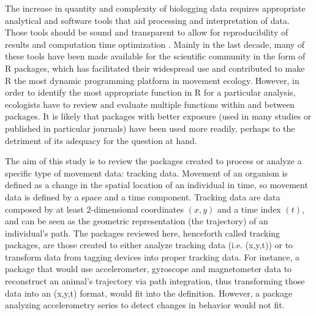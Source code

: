 \documentclass[a4paper,12pt]{article}
\begin{document}
	The increase in quantity and complexity of biologging data requires appropriate analytical and software tools that aid processing and interpretation of data. Those tools should be sound and transparent to allow for reproducibility of results and computation time optimization \citep{Urbano2010, reichman_challenges_2011, lowndes_our_2017}. %
	Mainly in the last decade, many of these tools have been made available for the scientific community in the form of R \citep{R2018} packages, which has facilitated their widespread use and contributed to make R the most dynamic programming platform in movement ecology. However, in order to identify the most appropriate function in R for a particular analysis, ecologists  have to review and evaluate multiple functions within and between packages. It is likely that packages with better exposure (used in many studies or published in particular journals) have been used more readily, perhaps to the detriment of its adequacy for the question at hand.
	
	The aim of this study is to review the packages created to process or analyze a specific type of movement data: tracking data. 
	Movement of an organism is defined as a change in the spatial location of an individual in time, so movement data is defined by a space and a time component. 
	Tracking data are data composed by at least 2-dimensional coordinates $(x,y)$ and a time index $(t)$, and can be seen as the geometric representation (the trajectory) of an individual's path. 
	The packages reviewed here, henceforth called tracking packages, are those created to either analyze tracking data (i.e. (x,y,t)) or to transform data from tagging devices into proper tracking data. For instance, a package that would use accelerometer, gyroscope and magnetometer data to reconstruct an animal's trajectory via path integration, thus transforming those data into an (x,y,t) format, would fit into the definition. However, a package analyzing accelerometry series to detect changes in behavior would not fit. 
	
\end{document}
